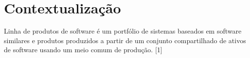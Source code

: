 









\frenchspacing 
\imprimircapa

\textual

\chapter*[Contextualização]{Contextualização}

Linha de produtos de software é um portfólio de sistemas baseados em software similares e produtos produzidos a partir de um conjunto compartilhado de ativos de software usando um meio comum de produção. [1]


\postextual

 



